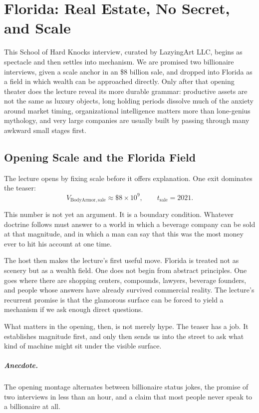 \chapter{Florida: Real Estate, No Secret, and Scale}

This School of Hard Knocks interview, curated by LazyingArt LLC, begins as spectacle and then settles into mechanism. We are promised two billionaire interviews, given a scale anchor in an \$8 billion sale, and dropped into Florida as a field in which wealth can be approached directly. Only after that opening theater does the lecture reveal its more durable grammar: productive assets are not the same as luxury objects, long holding periods dissolve much of the anxiety around market timing, organizational intelligence matters more than lone-genius mythology, and very large companies are usually built by passing through many awkward small stages first.

\section{Opening Scale and the Florida Field}

The lecture opens by fixing scale before it offers explanation. One exit dominates the teaser:
\begin{equation}
V_{\mathrm{BodyArmor,sale}} \approx \$8\times 10^9,
\qquad
t_{\mathrm{sale}} = 2021.
\end{equation}

This number is not yet an argument. It is a boundary condition. Whatever doctrine follows must answer to a world in which a beverage company can be sold at that magnitude, and in which a man can say that this was the most money ever to hit his account at one time.

The host then makes the lecture's first useful move. Florida is treated not as scenery but as a wealth field. One does not begin from abstract principles. One goes where there are shopping centers, compounds, lawyers, beverage founders, and people whose answers have already survived commercial reality. The lecture's recurrent promise is that the glamorous surface can be forced to yield a mechanism if we ask enough direct questions.

What matters in the opening, then, is not merely hype. The teaser has a job. It establishes magnitude first, and only then sends us into the street to ask what kind of machine might sit under the visible surface.

\paragraph{Anecdote.}
The opening montage alternates between billionaire status jokes, the promise of two interviews in less than an hour, and a claim that most people never speak to a billionaire at all.

